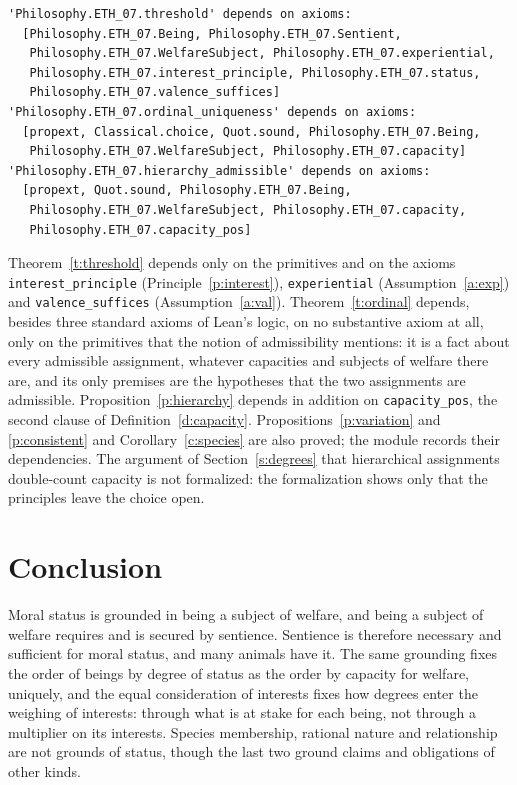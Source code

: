 \documentclass{situationist-preprint}
\begin{document}
\begin{lstlisting}
'Philosophy.ETH_07.threshold' depends on axioms:
  [Philosophy.ETH_07.Being, Philosophy.ETH_07.Sentient,
   Philosophy.ETH_07.WelfareSubject, Philosophy.ETH_07.experiential,
   Philosophy.ETH_07.interest_principle, Philosophy.ETH_07.status,
   Philosophy.ETH_07.valence_suffices]
'Philosophy.ETH_07.ordinal_uniqueness' depends on axioms:
  [propext, Classical.choice, Quot.sound, Philosophy.ETH_07.Being,
   Philosophy.ETH_07.WelfareSubject, Philosophy.ETH_07.capacity]
'Philosophy.ETH_07.hierarchy_admissible' depends on axioms:
  [propext, Quot.sound, Philosophy.ETH_07.Being,
   Philosophy.ETH_07.WelfareSubject, Philosophy.ETH_07.capacity,
   Philosophy.ETH_07.capacity_pos]
\end{lstlisting}

Theorem~\ref{t:threshold} depends only on the primitives and on the axioms \texttt{interest\_principle} (Principle~\ref{p:interest}), \texttt{experiential} (Assumption~\ref{a:exp}) and \texttt{valence\_suffices} (Assumption~\ref{a:val}). Theorem~\ref{t:ordinal} depends, besides three standard axioms of Lean's logic, on no substantive axiom at all, only on the primitives that the notion of admissibility mentions: it is a fact about every admissible assignment, whatever capacities and subjects of welfare there are, and its only premises are the hypotheses that the two assignments are admissible. Proposition~\ref{p:hierarchy} depends in addition on \texttt{capacity\_pos}, the second clause of Definition~\ref{d:capacity}. Propositions~\ref{p:variation} and \ref{p:consistent} and Corollary~\ref{c:species} are also proved; the module records their dependencies. The argument of Section~\ref{s:degrees} that hierarchical assignments double-count capacity is not formalized: the formalization shows only that the principles leave the choice open.

\section{Conclusion}

Moral status is grounded in being a subject of welfare, and being a subject of welfare requires and is secured by sentience. Sentience is therefore necessary and sufficient for moral status, and many animals have it. The same grounding fixes the order of beings by degree of status as the order by capacity for welfare, uniquely, and the equal consideration of interests fixes how degrees enter the weighing of interests: through what is at stake for each being, not through a multiplier on its interests. Species membership, rational nature and relationship are not grounds of status, though the last two ground claims and obligations of other kinds.
\end{document}

